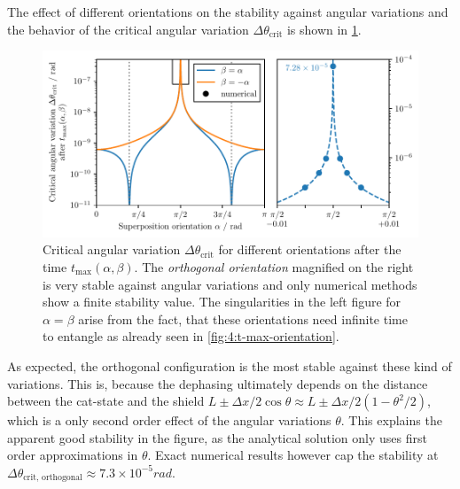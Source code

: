The effect of different orientations on the stability against angular variations and the behavior of the critical angular variation $\Delta \theta_\mathrm{crit}$ is shown in \cref{fig:4:theta-crit-orientation}.
\begin{figure}[!htbp]
  \centering
  \includegraphics[width=\textwidth]{./../figures/theta-variance/theta-crit-orientation-complete.pdf}
  \caption{Critical angular variation $\Delta \theta_\mathrm{crit}$ for different orientations after the time $t_\mathrm{max}(\alpha, \beta)$. The \emph{orthogonal orientation} magnified on the right is very stable against angular variations and only numerical methods show a finite stability value. The singularities in the left figure for $\alpha = \beta$ arise from the fact, that these orientations need infinite time to entangle as already seen in \cref{fig:4:t-max-orientation}.}
  \label{fig:4:theta-crit-orientation}
\end{figure}
As expected, the orthogonal configuration is the most stable against these kind of variations. This is, because the dephasing ultimately depends on the distance between the cat-state and the shield $L \pm \Delta x/2 \cos\theta \approx L \pm \Delta x/2 (1 - \theta^2/2)$, which is a only second order effect of the angular variations $\theta$.
This explains the apparent  good stability in the figure, as the analytical solution only uses first order approximations in $\theta$.
Exact numerical results however cap the stability at $\Delta \theta_\mathrm{crit,\,orthogonal} \approx 7.3\times 10^{-5}\si{rad}$.

